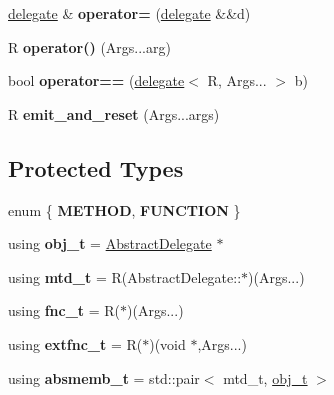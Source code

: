 \begin{DoxyCompactItemize}
\item 
\hyperlink{classgxx_1_1delegate}{delegate} \& {\bfseries operator=} (\hyperlink{classgxx_1_1delegate}{delegate} \&\&d)\hypertarget{classgxx_1_1delegate_a942965b72aa98b564f3b9fcc5e2769e4}{}\label{classgxx_1_1delegate_a942965b72aa98b564f3b9fcc5e2769e4}

\item 
R {\bfseries operator()} (Args...\+arg)\hypertarget{classgxx_1_1delegate_a62c64d47078a90986be2920ef6d2aa8f}{}\label{classgxx_1_1delegate_a62c64d47078a90986be2920ef6d2aa8f}

\item 
bool {\bfseries operator==} (\hyperlink{classgxx_1_1delegate}{delegate}$<$ R, Args... $>$ b)\hypertarget{classgxx_1_1delegate_a9a726537a2dbaa5f922dee3e76b464a0}{}\label{classgxx_1_1delegate_a9a726537a2dbaa5f922dee3e76b464a0}

\item 
R {\bfseries emit\+\_\+and\+\_\+reset} (Args...\+args)\hypertarget{classgxx_1_1delegate_a309788f98a8dd4554790550b373b3116}{}\label{classgxx_1_1delegate_a309788f98a8dd4554790550b373b3116}

\end{DoxyCompactItemize}
\subsection*{Protected Types}
\begin{DoxyCompactItemize}
\item 
enum \{ {\bfseries M\+E\+T\+H\+OD}, 
{\bfseries F\+U\+N\+C\+T\+I\+ON}
 \}\hypertarget{classgxx_1_1delegate_a554a52c49e319312eea93ccd8aa118a3}{}\label{classgxx_1_1delegate_a554a52c49e319312eea93ccd8aa118a3}

\item 
using {\bfseries obj\+\_\+t} = \hyperlink{classgxx_1_1AbstractDelegate}{Abstract\+Delegate} $\ast$\hypertarget{classgxx_1_1delegate_a6b84dc0b374f80cb03c0290403cd7f78}{}\label{classgxx_1_1delegate_a6b84dc0b374f80cb03c0290403cd7f78}

\item 
using {\bfseries mtd\+\_\+t} = R(Abstract\+Delegate\+::$\ast$)(Args...)\hypertarget{classgxx_1_1delegate_a4995c00b9f75767b129a153b6f982d4b}{}\label{classgxx_1_1delegate_a4995c00b9f75767b129a153b6f982d4b}

\item 
using {\bfseries fnc\+\_\+t} = R($\ast$)(Args...)\hypertarget{classgxx_1_1delegate_aa15443cd7b3f360edf6672e69d61718b}{}\label{classgxx_1_1delegate_aa15443cd7b3f360edf6672e69d61718b}

\item 
using {\bfseries extfnc\+\_\+t} = R($\ast$)(void $\ast$,Args...)\hypertarget{classgxx_1_1delegate_ab4ad330d6c5142761478dade9aeeae2b}{}\label{classgxx_1_1delegate_ab4ad330d6c5142761478dade9aeeae2b}

\item 
using {\bfseries absmemb\+\_\+t} = std\+::pair$<$ mtd\+\_\+t, \hyperlink{classgxx_1_1AbstractDelegate}{obj\+\_\+t} $>$\hypertarget{classgxx_1_1delegate_ab5c94c447daf8c6b1f539fcbdb413a99}{}\label{classgxx_1_1delegate_ab5c94c447daf8c6b1f539fcbdb413a99}

\end{DoxyCompactItemize}
